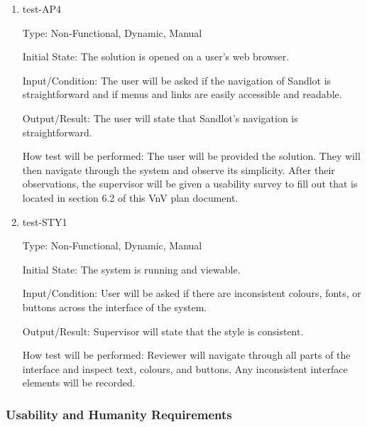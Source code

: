 \documentclass[12pt, titlepage]{article}
\begin{document}
\begin{enumerate}
\item{test-AP4\\}

Type: Non-Functional, Dynamic, Manual
					
Initial State: The solution is opened on a user's web browser.
					
Input/Condition: The user will be asked if the navigation of Sandlot is straightforward 
and if menus and links are easily accessible and readable.
					
Output/Result: The user will state that Sandlot's navigation is straightforward.
					
How test will be performed: The user will be provided the solution. They will then 
navigate through the system and observe its simplicity. After their observations, 
the supervisor will be given a usability survey to fill out that is located in 
section 6.2 of this VnV plan document.

\item{test-STY1\\}

Type: Non-Functional, Dynamic, Manual
					
Initial State: The system is running and viewable.
					
Input/Condition: User will be asked if there are inconsistent colours,
fonts, or buttons across the interface of the system.
					
Output/Result: Supervisor will state that the style is consistent.
					
How test will be performed: Reviewer will navigate through all parts
of the interface and inspect text, colours, and buttons. Any 
inconsistent interface elements will be recorded. 

\end{enumerate}

\subsubsection{Usability and Humanity Requirements}
\end{document}
